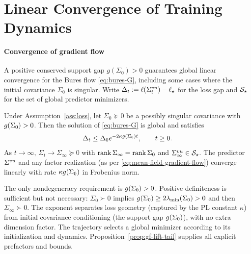 \section{Linear Convergence of Training Dynamics}
\label{sec:convergence}\label{sec:balanced-convergence}
\label{sec:sampling}\label{sec:finite-width}

\paragraph{Convergence of gradient flow}
A positive conserved support gap $g(\Sigma_0) > 0$ guarantees global linear convergence for the Bures flow \eqref{eq:bures-G}, including some cases where the initial covariance $\Sigma_0$ is singular. Write $\Delta_t:=\ell(\Sigma^{vu}_t)-\ell_\star$ for the loss gap and $\mathcal S_\star$ for the set of global predictor minimizers.

\begin{theorem}\label{thm:gf}\label{thm:balanced-convergence}
Under Assumption~\ref{ass:loss}, let $\Sigma_0\succeq0$ be a possibly
singular covariance with $g(\Sigma_0)>0$. 
Then the solution of \eqref{eq:bures-G} is global and satisfies
\begin{equation}\label{eq:gf-rate}
 \Delta_t\le\Delta_0e^{-2\kappa g(\Sigma_0)t},\qquad t\ge0.
\end{equation}
As $t \to \infty$, $\Sigma_t \to \Sigma_\infty\succeq0$ with
$\operatorname{rank}\Sigma_\infty=\operatorname{rank}\Sigma_0$ and $\Sigma^{vu}_\infty\in\mathcal S_\star$.
The predictor $\Sigma^{vu}$ and any factor realization (as per \eqref{eq:mean-field-gradient-flow}) converge linearly with rate $\kappa g(\Sigma_0)$ in Frobenius norm.
\end{theorem}

The only nondegeneracy requirement is $g(\Sigma_0)>0$.
Positive definiteness is sufficient but not necessary: $\Sigma_0\succ0$ implies $g(\Sigma_0)\ge2\lambda_{\min}(\Sigma_0)>0$ and then
$\Sigma_\infty\succ0$. The exponent separates loss geometry (captured by the PL constant $\kappa$)
from initial covariance conditioning (the support gap $g(\Sigma_0)$), with no extra
dimension factor. The trajectory selects a global minimizer according to its initialization and dynamics. Proposition~\ref{prop:gf-lift-tail} supplies all explicit prefactors and bounds.

